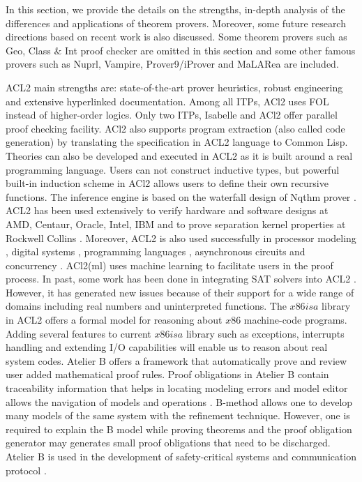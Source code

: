 \label{SAFD}
In this section, we provide the details on the strengths, in-depth analysis of the differences and applications of theorem provers. 
Moreover, some future research directions based on recent work is also discussed. Some theorem provers such as Geo, Class $\&$ Int proof 
checker are omitted in this section and some other famous provers such as Nuprl, Vampire, Prover9/iProver and MaLARea are included.

ACL2 main strengths are: state-of-the-art prover heuristics, robust engineering and extensive hyperlinked documentation. 
Among all ITPs, ACl2 uses FOL instead of higher-order logics. Only two ITPs, Isabelle and ACl2 offer parallel proof checking facility. 
ACl2 also supports program extraction (also called code generation) by translating the specification in ACL2 language to Common Lisp. Theories can also be developed and
executed in ACL2 as it is built around a real programming language. Users can not construct inductive types, but powerful built-in induction scheme in ACl2 allows users 
to define their own recursive functions. The inference engine is based on the waterfall design of Nqthm prover .
ACL2 has been used extensively to verify hardware and software designs at AMD, Centaur, Oracle, Intel, IBM and to prove separation 
kernel properties at Rockwell Collins . Moreover, ACL2 is also used successfully in processor modeling , 
digital systems , programming languages , asynchronous circuits  and 
concurrency . ACl2(ml)  uses machine learning to facilitate users in the proof process.
In past, some work has been done in integrating SAT solvers into ACL2 . 
However, it has generated new issues because of their support for a wide range of domains including real numbers and uninterpreted 
functions. The $x86isa$ library   in ACL2 offers a formal model for reasoning about $x86$ machine-code programs. 
Adding several features to current $x86isa$ library such as exceptions, interrupts handling and extending I/O capabilities will enable 
us to reason about real system codes. 
Atelier B offers a framework that automatically prove and review user added mathematical proof rules. 
Proof obligations in Atelier B contain traceability information that helps in locating modeling errors
and model editor allows the navigation of models and operations . B-method allows one to develop many models of the same system 
with the refinement technique. However, one is required to explain the B model while proving theorems and the proof obligation generator may generates small 
proof obligations that need to be discharged.
Atelier B is used in the development of safety-critical systems  and communication protocol .
